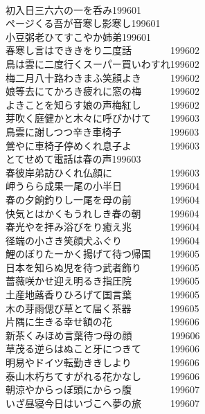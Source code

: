 \begin{multicols}{2}
\\初入日三六六の一を呑み\hfill{199601}
\\ページくる吾が音寒し影寒し\hfill{199601}
\\小豆粥老ひてすこやか姉弟\hfill{199601}
\\春寒し言はでききをり二度話　　　　\hfill{199602}
\\鳥は雲に二度行くスーパー買いわすれ\hfill{199602}
\\梅二月八十路わきまふ笑顔よき　　　\hfill{199602}
\\娘等去にてかろき疲れに窓の梅　　　\hfill{199602}
\\よきことを知らす娘の声梅紅し　　　\hfill{199602}
\\芽吹く庭健かと木々に呼びかけて　　\hfill{199603}
\\鳥雲に謝しつつ辛き車椅子　　　　　\hfill{199603}
\\鶯やに車椅子停めくれ息子よ　　　　\hfill{199603}
\\とてせめて電話は春の声\hfill{199603}
\\春彼岸弟訪ひくれ仏顔に　　　　　　\hfill{199603}
\\岬うらら成果一尾の小半日　　　　　\hfill{199604}
\\春の夕餉釣りし一尾を母の前　　　　\hfill{199604}
\\快気とはかくもうれしき春の朝　　　\hfill{199604}
\\春光やを拝み浴びをり癒え兆　　　　\hfill{199604}
\\径端の小さき笑顔犬ふぐり　　　　　\hfill{199604}
\\鯉のぼりたーかく揚げて待つ帰国　　\hfill{199605}
\\日本を知らぬ児を待つ武者飾り　　　\hfill{199605}
\\薔薇咲かせ迎え明るき指圧院　　　　\hfill{199605}
\\土産地蕗香りひろげて国言葉　　　　\hfill{199605}
\\木の芽雨偲び草とて届く茶器　　　　\hfill{199605}
\\片隅に生きる幸せ額の花　　　　　　\hfill{199606}
\\新茶くみほめ言葉待つ母の顔　　　　\hfill{199606}
\\草茂る逆らはぬこと牙につきて　　　\hfill{199606}
\\明易やドイツ転勤ききしより　　　　\hfill{199606}
\\泰山木朽ちてすがれる花かなし　　　\hfill{199606}
\\朝涼やからっぽ頭にからっ腹　　　　\hfill{199607}
\\いざ昼寝今日はいづこへ夢の旅　　　\hfill{199607}

\end{multicols}
